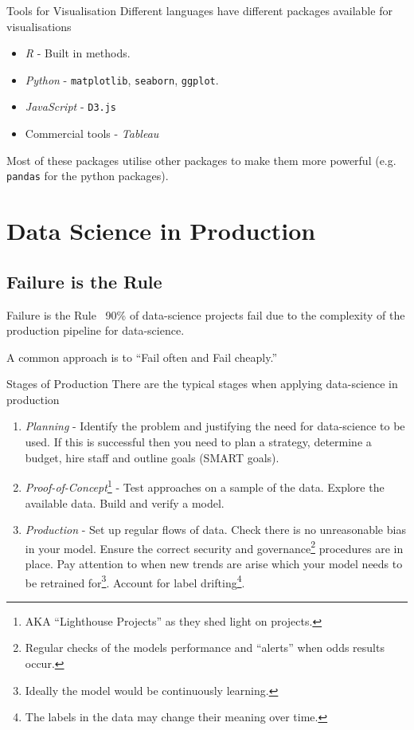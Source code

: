 \documentclass[11pt,a4paper]{article}
\begin{document}
  \begin{proposition}{Tools for Visualisation}
    Different languages have different packages available for visualisations
    \begin{itemize}
      \item \textit{R} - Built in methods.
      \item \textit{Python} - \texttt{matplotlib}, \texttt{seaborn}, \texttt{ggplot}.
      \item \textit{JavaScript} - \texttt{D3.js}
      \item Commercial tools - \textit{Tableau}
    \end{itemize}
    Most of these packages utilise other packages to make them more powerful (e.g. \texttt{pandas}  for the python packages).
  \end{proposition}

\section{Data Science in Production}\label{sec_production}

\subsection{Failure is the Rule}

  \begin{remark}{Failure is the Rule}
    ~90\% of data-science projects fail due to the complexity of the production pipeline for data-science.
    \par A common approach is to ``Fail often and Fail cheaply.''
  \end{remark}

  \begin{remark}{Stages of Production}
    There are the typical stages when applying data-science in production
    \begin{enumerate}
      \item \textit{Planning} - Identify the problem and justifying the need for data-science to be used. If this is successful then you need to plan a strategy, determine a budget, hire staff and outline goals (SMART goals).
      \item \textit{Proof-of-Concept}\footnote{AKA ``Lighthouse Projects'' as they shed light on projects.} - Test approaches on a sample of the data. Explore the available data. Build and verify a model.
      \item \textit{Production} - Set up regular flows of data. Check there is no unreasonable bias in your model. Ensure the correct security and governance\footnote{Regular checks of the models performance and ``alerts'' when odds results occur.} procedures are in place. Pay attention to when new trends are arise which your model needs to be retrained for\footnote{Ideally the model would be continuously learning.}. Account for label drifting\footnote{The labels in the data may change their meaning over time.}.
    \end{enumerate}
  \end{remark}
\end{document}
